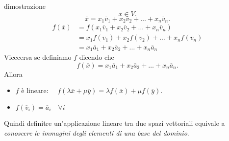 \documentclass[x11names]{article}
\begin{document}
\begin{es}{dimostrazione}
\[
\overline{x} \in V
.\] 
\[
\overline{x} = x_1 \overline{v}_{1} + x_2\overline{v}_{2} + \dots + x_{n}\overline{v}_{n}
.\] 
\begin{align*}
	f\left(\overline{x}\right) &= f\left(x_1 \overline{v}_{1} + x_2\overline{v}_{2} + \dots + x_{n}\overline{v}_{n}\right) \\
				   &= x_1 f\left(\overline{v}_{1}\right) + x_2 f\left(\overline{v}_{2}\right) + \dots + x_{n}f\left(\overline{v}_{n}\right) \\
				   &= x_1 \overline{a}_{1} + x_2 \overline{a}_{2} + \dots + x_{n} \overline{a}_{n}
\end{align*}
Vicecersa se definiamo $f$ dicendo che 
\[
f\left(\overline{x}\right) = x_1 \overline{a}_{1} + x_2 \overline{a}_{2} + \dots + x_{n} \overline{a}_{n}
.\] 
Allora
\begin{itemize}
	\item $f$ è lineare: $\quad f\left(\lambda \overline{x} + \mu \overline{y}\right) = \lambda f\left(\overline{x}\right) + \mu f\left(\overline{y}\right)$.
	\item $f\left(\overline{v}_{i}\right) = \overline{a}_{i} \quad \forall i$
\end{itemize}
\end{es}


Quindi definitre un'applicazione lineare tra due spazi vettoriali equivale a \textit{conoscere le immagini degli elementi di una base del dominio}.
\end{document}
